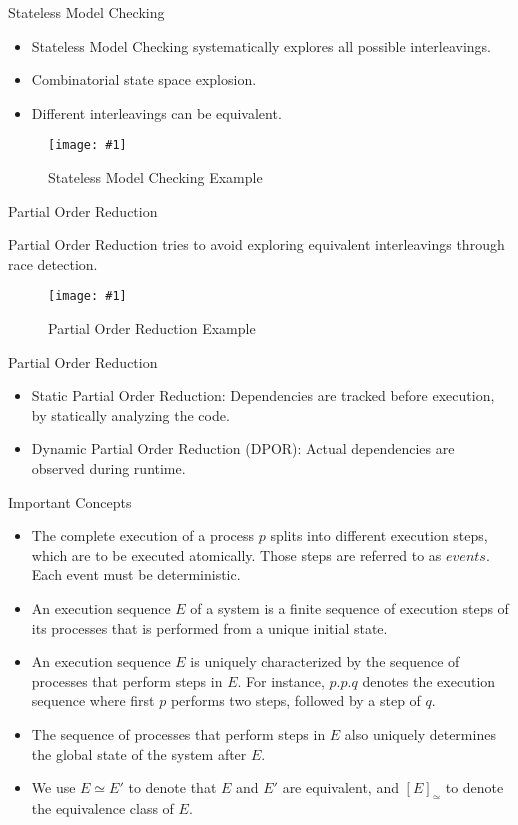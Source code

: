 \documentclass[9pt]{beamer}
\newcommand{\trace}[2]{
\begin{figure}[H]
\centering
\texttt{[image: \#1]}
\caption{#2}
\label{#2}
\end{figure}
}
\newcommand{\tracelong}[2]{
\begin{figure}[H]
\centering
\texttt{[image: \#1]}
\caption{#2}
\label{#2}
\end{figure}
}
\begin{document}
\begin{frame} {Stateless Model Checking}

\begin{itemize}[<+->]
    \item Stateless Model Checking systematically explores all possible interleavings.
    \item Combinatorial state space explosion.
    \item Different interleavings can be equivalent.
\end{itemize}
\pause
\tracelong{../img/initstateless.png}{Stateless Model Checking Example}

\end{frame}

\begin{frame} {Partial Order Reduction}

Partial Order Reduction tries to avoid exploring equivalent interleavings through race detection.

\trace{../img/initpor.png}{Partial Order Reduction Example}

\end{frame}

\begin{frame} {Partial Order Reduction}
\begin{itemize}[<+->]
    \item Static Partial Order Reduction: Dependencies are tracked before execution, by statically analyzing the code.
    \item Dynamic Partial Order Reduction (DPOR): Actual dependencies are observed during runtime.
\end{itemize}

\end{frame}


\begin{frame} {Important Concepts}

\begin{itemize}[<+->]
    \item The complete execution of a process $p$ splits into different execution steps, which are
    to be executed atomically. Those steps are referred to as $events$. Each event must be deterministic.
    \item An execution sequence $E$ of a system is a finite sequence of execution steps
    of its processes that is performed from a unique initial state.
    \item An execution sequence $E$ is uniquely characterized by the sequence of processes
    that perform steps in $E$. For instance, $p.p.q$ denotes the execution
    sequence where first $p$ performs two steps, followed by a step of $q$.
    \item The sequence of processes that perform steps in $E$ also uniquely
    determines the global state of the system after $E$.
    \item We use $E \simeq E'$ to denote that $E$ and $E'$ are
    equivalent, and $[E]_{\simeq}$ to denote the equivalence class of $E$.
\end{itemize}

\end{frame}
\end{document}

